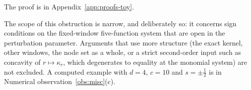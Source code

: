 The proof is in Appendix~\ref{app:proofs-toy}.

The scope of this obstruction is narrow, and deliberately so: it concerns sign conditions on the fixed-window
five-function system that are open in the perturbation parameter. Arguments that use more structure (the exact kernel,
other windows, the node set as a whole, or a strict second-order input such as concavity of $r\mapsto\kappa_r$, which
degenerates to equality at the monomial system) are not excluded. A computed example with $d=4$, $c=10$ and
$s=\pm\frac12$ is in Numerical observation~\ref{obs:misc}(c).

